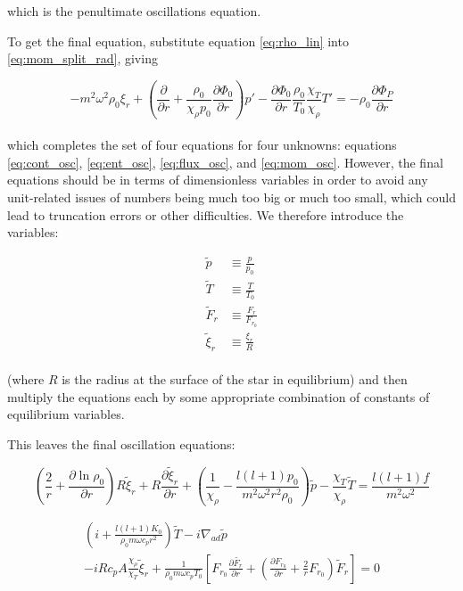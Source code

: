 \documentclass[11pt]{amsart}
\begin{document}
which is the penultimate oscillations equation.

To get the final equation, substitute equation \ref{eq:rho_lin} into \ref{eq:mom_split_rad}, giving

\begin{equation} \label{eq:mom_osc}
- m^{2} \omega^{2} \rho_{0} \xi_{r} 
+ \left( \frac{\partial}{\partial r} + \frac{\rho_{0}}{\chi_{\rho} p_{0}} \frac{\partial \Phi_{0}}{\partial r} \right) p'
-  \frac{\partial \Phi_{0}}{\partial r} \frac{\rho_{0}}{T_{0}} \frac{\chi_{T}}{\chi_{\rho}} T'
=
- \rho_{0} \frac{\partial \Phi_{P}}{\partial r}
\end{equation}
\\
which completes the set of four equations for four unknowns: equations \ref{eq:cont_osc}, \ref{eq:ent_osc}, \ref{eq:flux_osc}, and \ref{eq:mom_osc}.
However, the final equations should be in terms of dimensionless variables in order to avoid
any unit-related issues of numbers being much too big or much too small, which could lead to truncation errors or other difficulties.
We therefore introduce the variables:

\begin{align}
\tilde{p} &\equiv \frac{p}{p_{0}} \\
\tilde{T} &\equiv \frac{T}{T_{0}} \\
\tilde{F}_{r} &\equiv \frac{F_{r}}{F_{r_{0}}} \\
\tilde{\xi}_{r} &\equiv \frac{\xi_{r}}{R}
\end{align}
\\
(where $R$ is the radius at the surface of the star in equilibrium) and then multiply the equations each by some appropriate combination of constants of equilibrium variables.

This leaves the final oscillation equations:

\begin{equation} \label{eq:cont_osc_dim}
\left( \frac{2}{r} + \frac{\partial \ln \rho_{0}}{\partial r} \right) R \tilde{\xi}_{r} + R \frac{\partial \tilde{\xi}_{r}}{\partial r} 
+ \left( \frac{1}{\chi_{\rho}} - \frac{l (l+1) p_{0}}{m^{2} \omega^{2} r^{2} \rho_{0} } \right) \tilde{p}
- \frac{\chi_{T}}{\chi_{\rho}} \tilde{T}
=
\frac{l (l+1) f}{m^{2} \omega^{2}}
\end{equation}

\begin{multline} \label{eq:ent_osc_dim}
\left( i  + \frac{l (l+1) K_{0}}{\rho_{0} m \omega c_{p} r^{2}} \right) \tilde{T}
-  i \nabla_{ad} \tilde{p} \\
- i R c_{p} A \frac{\chi_{\rho}}{\chi_{T}} \tilde{\xi}_{r}
+ \frac{1}{\rho_{0} m \omega c_{p} T_{0}} \left[ F_{r_{0}} \frac{\partial \tilde{F_{r}}}{\partial r} + \left( \frac{\partial F_{r_{0}}}{\partial r} + \frac{2}{r} F_{r_{0}} \right) \tilde{F}_{r} \right]
=
0
\end{multline}
\end{document}
